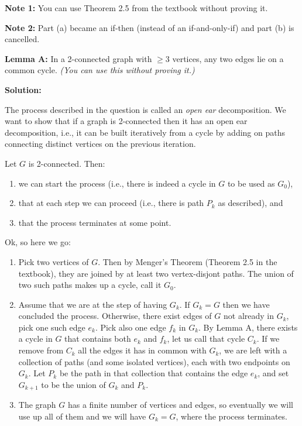 \documentclass[10pt,landscape]{article}
\renewcommand{\geq}{\geqslant}
\begin{document}
\begin{multicols}{2}
\textbf{Note 1:} You can use Theorem 2.5 from the textbook without proving it.

\textbf{Note 2:} Part (a) became an if-then (instead of an if-and-only-if) and part (b) is cancelled.

\textbf{Lemma A:} In a 2-connected graph with $\geq 3$ vertices, any two edges lie on a common cycle. \emph{(You can use this without proving it.)}\\

\bigskip


\textbf{Solution:}

The process described in the question is called an \emph{open ear} decomposition. We want to show that
if a graph is 2-connected then it has an open ear decomposition, i.e., it can be built iteratively from a cycle by adding on paths connecting distinct vertices on the previous iteration. 

Let $G$ is 2-connected. Then:
\begin{enumerate}
\item[(1)] we can start the process (i.e., there is indeed a cycle in $G$ to be used as $G_0$), 
\item[(2)] that at each step we can proceed (i.e., there is  path $P_k$ as described), and 
\item[(3)] that the process terminates at some point.
\end{enumerate}
Ok, so here we go:
\begin{enumerate}
\item[(1)] Pick two vertices of $G$. Then by Menger's Theorem (Theorem 2.5 in the textbook), they are joined by at least two vertex-disjont paths. The union of two such paths makes up a cycle, call it $G_0$.
\item[(2)] Assume that we are at the step of having $G_k$. If $G_k=G$ then we have concluded the process. Otherwise, there exist edges of $G$ not already in $G_k$, pick one such edge $e_k$. Pick also one edge $f_k$ in $G_k$. By Lemma A, there exists a cycle in $G$ that contains both $e_k$ and $f_k$, let us call that cycle $C_k$. If we remove from $C_k$ all the edges it has in common with $G_k$, we are left with a collection of paths (and some isolated vertices), each with two endpoints on $G_k$. Let $P_k$ be the path in that collection that contains the edge $e_k$, and set $G_{k+1}$ to be the union of $G_k$ and $P_k$.
\item[(3)] The graph $G$ has a finite number of vertices and edges, so eventually we will use up all of them and we will have $G_k=G$, where the process terminates.
\end{enumerate}


\end{multicols}
\end{document}
